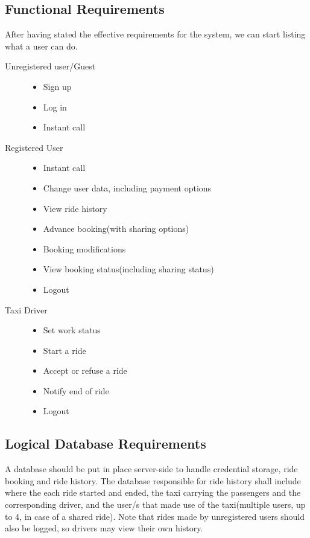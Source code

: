 \subsection{Functional Requirements}
	After having stated the effective requirements for the system, we can start listing what a user can do.
		\begin{description}
		\item[Unregistered user/Guest] \hfill
			\begin{itemize}
				\item Sign up
				\item Log in
				\item Instant call
			\end{itemize}
		\item[Registered User] \hfill
			\begin{itemize}
				\item Instant call
				\item Change user data, including payment options
				\item View ride history
				\item Advance booking(with sharing options)
				\item Booking modifications
				\item View booking status(including sharing status)
				\item Logout
			\end{itemize}
		\item[Taxi Driver] \hfill
			\begin{itemize}
				\item Set work status
				\item Start a ride
				\item Accept or refuse a ride
				\item Notify end of ride
				\item Logout
			\end{itemize}
		\end{description}
\newpage
\subsection{Logical Database Requirements}
	A database should be put in place server-side to handle credential storage, ride booking and ride history. The database responsible for ride history
	shall include where the each ride started and ended, the taxi carrying the passengers and the corresponding driver, and the user/s that made use of the
	taxi(multiple users, up to 4, in case of a shared ride). Note that rides made by unregistered users should also be logged, so drivers may view their own history.
